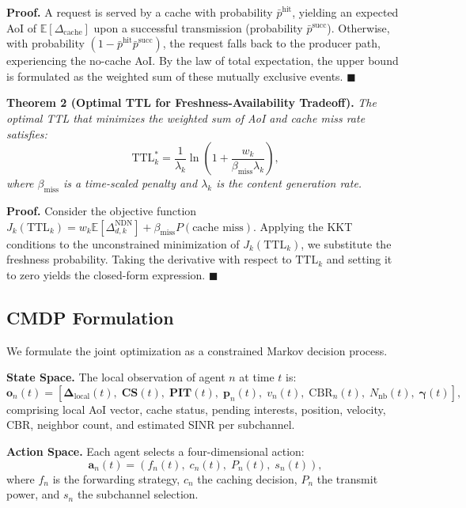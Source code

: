 \documentclass[journal]{IEEEtran}
\begin{document}
\textbf{Proof.} A request is served by a cache with probability $\bar{p}^{\text{hit}}$, yielding an expected AoI of $\mathbb{E}[\Delta_{\text{cache}}]$ upon a successful transmission (probability $\bar{p}^{\text{succ}}$). Otherwise, with probability $(1 - \bar{p}^{\text{hit}} \bar{p}^{\text{succ}})$, the request falls back to the producer path, experiencing the no-cache AoI. By the law of total expectation, the upper bound is formulated as the weighted sum of these mutually exclusive events. \hfill $\blacksquare$

\textbf{Theorem 2 (Optimal TTL for Freshness-Availability Tradeoff).} \emph{The optimal TTL that minimizes the weighted sum of AoI and cache miss rate satisfies:}
\begin{equation} \label{eq:theorem2}
\text{TTL}_k^* = \frac{1}{\lambda_k} \ln\left(1 + \frac{w_k}{\beta_{\text{miss}} \lambda_k}\right),
\end{equation}
\emph{where $\beta_{\text{miss}}$ is a time-scaled penalty and $\lambda_k$ is the content generation rate.}

\textbf{Proof.} Consider the objective function $J_k(\text{TTL}_k) = w_k \mathbb{E}[\Delta_{d,k}^{\text{NDN}}] + \beta_{\text{miss}} P(\text{cache miss})$. Applying the KKT conditions to the unconstrained minimization of $J_k(\text{TTL}_k)$, we substitute the freshness probability. Taking the derivative with respect to $\text{TTL}_k$ and setting it to zero yields the closed-form expression. \hfill $\blacksquare$

\subsection{CMDP Formulation} \label{subsec:cmdp}

We formulate the joint optimization as a constrained Markov decision process.

\textbf{State Space.} The local observation of agent $n$ at time $t$ is:
\begin{equation}
\mathbf{o}_n(t) = [\boldsymbol{\Delta}_{\text{local}}(t),\; \mathbf{CS}(t),\; \mathbf{PIT}(t),\; \mathbf{p}_n(t),\; v_n(t),\; \text{CBR}_n(t),\; N_{\text{nb}}(t),\; \boldsymbol{\gamma}(t)],
\end{equation}
comprising local AoI vector, cache status, pending interests, position, velocity, CBR, neighbor count, and estimated SINR per subchannel.

\textbf{Action Space.} Each agent selects a four-dimensional action:
\begin{equation}
\mathbf{a}_n(t) = (f_n(t),\; c_n(t),\; P_n(t),\; s_n(t)),
\end{equation}
where $f_n$ is the forwarding strategy, $c_n$ the caching decision, $P_n$ the transmit power, and $s_n$ the subchannel selection.
\end{document}
